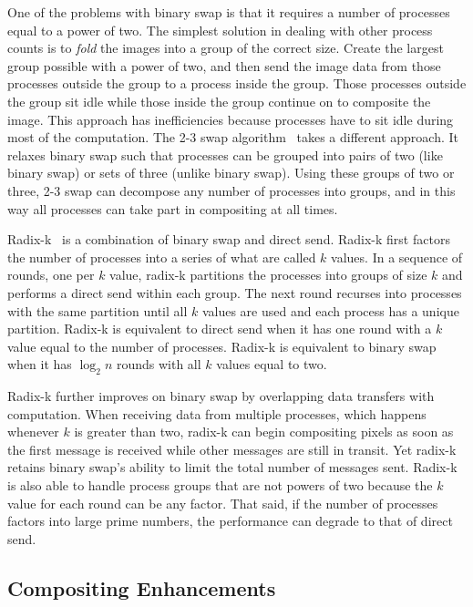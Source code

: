 \documentclass{sig-alternate}
\newcommand*{\lcite}[1]{~\cite{#1}}
\newcommand*{\keyterm}[1]{\emph{#1}}
\begin{document}
One of the problems with binary swap is that it requires a number of
processes equal to a power of two.  The simplest solution in dealing with
other process counts is to \keyterm{fold} the images into a group of the
correct size.  Create the largest group possible with a power of two, and
then send the image data from those processes outside the group to a
process inside the group.  Those processes outside the group sit idle while
those inside the group continue on to composite the image.  This approach
has inefficiencies because processes have to sit idle during most of the
computation.  The 2-3 swap algorithm\lcite{23Swap} takes a different
approach.  It relaxes binary swap such that processes can be grouped into
pairs of two (like binary swap) or sets of three (unlike binary swap).
Using these groups of two or three, 2-3 swap can decompose any number of
processes into groups, and in this way all processes can take part in
compositing at all times.

Radix-k\lcite{RadixK} is a combination of binary swap and direct send.
Radix-k first factors the number of processes into a series of what are
called $k$ values.  In a sequence of rounds, one per $k$ value, radix-k
partitions the processes into groups of size $k$ and performs a direct send
within each group.  The next round recurses into processes with the same
partition until all $k$ values are used and each process has a unique
partition.  Radix-k is equivalent to direct send when it has one round with
a $k$ value equal to the number of processes.  Radix-k is equivalent to
binary swap when it has $\log_{2} n$ rounds with all $k$ values equal to
two.

Radix-k further improves on binary swap by overlapping data transfers with
computation.  When receiving data from multiple processes, which happens
whenever $k$ is greater than two, radix-k can begin compositing pixels as
soon as the first message is received while other messages are still in
transit.  Yet radix-k retains binary swap's ability to limit the total
number of messages sent.  Radix-k is also able to handle process groups
that are not powers of two because the $k$ value for each round can be any
factor.  That said, if the number of processes factors into large prime
numbers, the performance can degrade to that of direct send.

\subsection{Compositing Enhancements}
\label{sec:CompositingEnhancements}
\end{document}
